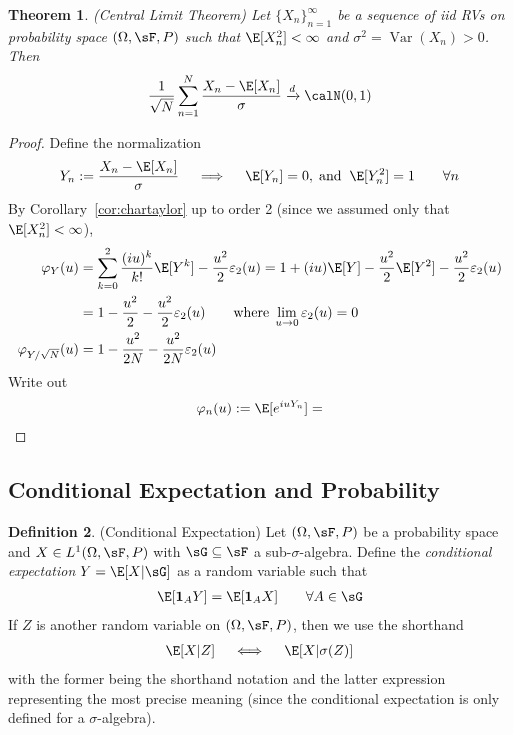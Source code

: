 \documentclass[12pt]{article}
\theoremstyle{plain}
\newtheorem{thm}{Theorem}[section]
\theoremstyle{definition}
\newtheorem{defn}[thm]{Definition}
\theoremstyle{remark}
\newcommand{\ra}{\rightarrow}
\newcommand{\one}[1]{\mathbf{1}_{#1}}
\newcommand{\Var}{\operatorname{Var}}
\newcommand{\dto}{\xrightarrow{d}}
\newcommand{\sumnN}{\sum^N_{n=1}}
\newcommand{\ninf}{_{n=1}^\infty}
\begin{document}
\begin{thm}\emph{(Central Limit Theorem)}
Let $\{X_n\}\ninf$ be a sequence of iid RVs
on probability space $(\Omega,\sF,P)$ such that
$\E[X^2_n]<\infty$ and $\sigma^2=\Var(X_n)>0$.
Then
\begin{align*}
  \frac{1}{\sqrt{N}}
  \sumnN \frac{X_n-\E[X_n]}{\sigma}
  \dto \calN(0,1)
\end{align*}
\end{thm}
\begin{proof}
Define the normalization
\begin{align*}
  Y_n := \frac{X_n-\E[X_n]}{\sigma}
  \quad\implies\quad
  \E[Y_n] = 0,\;\text{and}\;\;
  \E[Y_n^2] = 1
  \qquad\forall n
\end{align*}
By Corollary~\ref{cor:chartaylor} up to order 2 (since we assumed only
that $\E[X^2_n]<\infty$),
\begin{align*}
  \varphi_Y(u)
  &=
  \sum_{k=0}^2
  \frac{(iu)^k}{k!}
  \E[Y^k]
  - \frac{u^2}{2}\varepsilon_2(u)
  =
  1 + (iu)\E[Y]
  - \frac{u^2}{2} \E[Y^2]
  - \frac{u^2}{2}\varepsilon_2(u)
  \\
  &=
  1
  - \frac{u^2}{2}
  - \frac{u^2}{2}\varepsilon_2(u)
  \qquad\text{where}\;
  \lim_{u\ra 0}\varepsilon_2(u)=0
  \\
  \varphi_{Y/\sqrt{N}}(u)
  &=
  1
  - \frac{u^2}{2N}
  - \frac{u^2}{2N}\varepsilon_2(u)
\end{align*}
Write out
\begin{align*}
  \varphi_n(u)
  :=
  \E[e^{iuY_n}]
  =
\end{align*}
\end{proof}


\clearpage
\subsection{Conditional Expectation and Probability}

\begin{defn}(Conditional Expectation)
Let $(\Omega,\sF,P)$ be a probability space and $X\in L^1(\Omega,\sF,P)$
with $\sG\subseteq\sF$ a sub-$\sigma$-algebra. Define the
\emph{conditional expectation} $Y=\E[X|\sG]$ as a random variable such
that
\begin{align*}
  \E[\one{A}Y] = \E[\one{A}X]
  \qquad \forall A\in \sG
\end{align*}
If $Z$ is another random variable on $(\Omega,\sF,P)$, then we use the
shorthand
\begin{align*}
  \E[X|Z]
  \quad\iff\quad
  \E[X|\sigma(Z)]
\end{align*}
with the former being the shorthand notation and the latter expression
representing the most precise meaning (since the conditional
expectation is only defined for a $\sigma$-algebra).
\end{defn}
\end{document}
